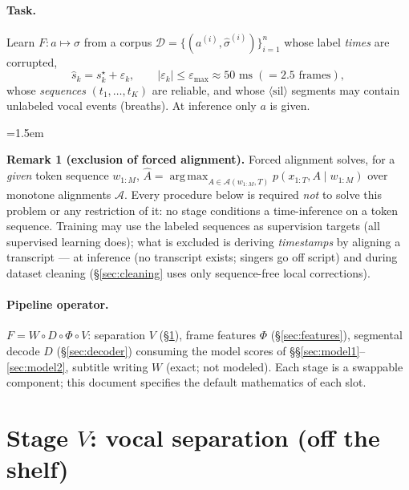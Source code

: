 \documentclass[10pt]{article}
\newcommand{\sil}{\langle\mathrm{sil}\rangle}
\DeclareMathOperator*{\argmax}{arg\,max}
\begin{document}
\paragraph{Task.} Learn $F: a \mapsto \sigma$ from a corpus $\mathcal{D} = \{(a^{(i)}, \hat{\sigma}^{(i)})\}_{i=1}^{n}$ whose label \emph{times} are corrupted,
\begin{equation}
\hat{s}_k = s_k^\star + \varepsilon_k, \qquad |\varepsilon_k| \le \varepsilon_{\max} \approx 50\text{ ms} \;(= 2.5\text{ frames}),
\label{eq:jitter}
\end{equation}
whose \emph{sequences} $(t_1,\dots,t_K)$ are reliable, and whose $\sil$ segments may contain unlabeled vocal events (breaths). At inference only $a$ is given.

\begin{samepage}
\begin{list}{}{\leftmargin=1.5em}
\item \textbf{Remark 1 (exclusion of forced alignment).}\label{rem:nofa}
Forced alignment solves, for a \emph{given} token sequence $w_{1:M}$,
$\hat{A} = \argmax_{A \in \mathcal{A}(w_{1:M}, T)} p(x_{1:T}, A \mid w_{1:M})$
over monotone alignments $\mathcal{A}$. Every procedure below is required \emph{not} to solve this problem or any restriction of it: no stage conditions a time-inference on a token sequence. Training may use the labeled sequences as supervision targets (all supervised learning does); what is excluded is deriving \emph{timestamps} by aligning a transcript --- at inference (no transcript exists; singers go off script) and during dataset cleaning (\S\ref{sec:cleaning} uses only sequence-free local corrections).
\end{list}
\end{samepage}

\paragraph{Pipeline operator.} $F = W \circ D \circ \Phi \circ V$: separation $V$ (\S\ref{sec:sep}), frame features $\Phi$ (\S\ref{sec:features}), segmental decode $D$ (\S\ref{sec:decoder}) consuming the model scores of \S\S\ref{sec:model1}--\ref{sec:model2}, subtitle writing $W$ (exact; not modeled). Each stage is a swappable component; this document specifies the default mathematics of each slot.

\section{Stage $V$: vocal separation (off the shelf)}\label{sec:sep}
\end{document}
